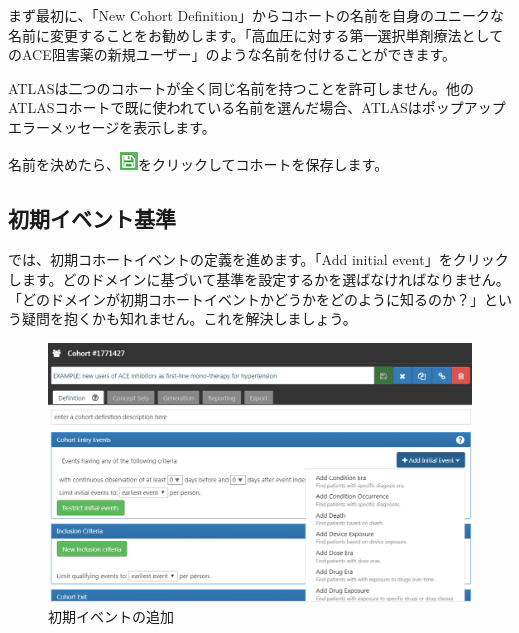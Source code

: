 \documentclass[
  11pt]{book}
\makeatletter
\newenvironment{kframe}{%
\medskip{}
\setlength{\fboxsep}{.8em}
 \def\at@end@of@kframe{}%
 \ifinner\ifhmode%
  \def\at@end@of@kframe{\end{minipage}}%
  \begin{minipage}{\columnwidth}%
 \fi\fi%
 \def\FrameCommand##1{\hskip\@totalleftmargin \hskip-\fboxsep
 \colorbox{myShadeColor}{##1}\hskip-\fboxsep
     \hskip-\linewidth \hskip-\@totalleftmargin \hskip\columnwidth}%
 \MakeFramed {\advance\hsize-\width
   \@totalleftmargin\z@ \linewidth\hsize
   \@setminipage}}%
 {\par\unskip\endMakeFramed%
 \at@end@of@kframe}
\newenvironment{rmdblock}[1]
  {
  \begin{itemize}
  \renewcommand{\labelitemi}{
    \raisebox{-.7\height}[0pt][0pt]{
      {\setkeys{Gin}{width=3em,keepaspectratio}\texttt{[image: images/\#1]}}
    }
  }
  \setlength{\fboxsep}{1em}
  \begin{kframe}
  \item
  }
  {
  \end{kframe}
  \end{itemize}
  }
\newenvironment{rmdimportant}
  {\begin{rmdblock}{important}}
  {\end{rmdblock}}
\theoremstyle{definition}
\theoremstyle{definition}
\theoremstyle{definition}
\theoremstyle{definition}
\theoremstyle{remark}
\makeatother
\begin{document}
まず最初に、「New Cohort Definition」からコホートの名前を自身のユニークな名前に変更することをお勧めします。「高血圧に対する第一選択単剤療法としてのACE阻害薬の新規ユーザー」のような名前を付けることができます。

\begin{rmdimportant}
ATLASは二つのコホートが全く同じ名前を持つことを許可しません。他のATLASコホートで既に使われている名前を選んだ場合、ATLASはポップアップエラーメッセージを表示します。
\end{rmdimportant}

名前を決めたら、\includegraphics{images/Cohorts/save.png}をクリックしてコホートを保存します。

\subsection{初期イベント基準}\label{ux521dux671fux30a4ux30d9ux30f3ux30c8ux57faux6e96}

では、初期コホートイベントの定義を進めます。「Add initial event」をクリックします。どのドメインに基づいて基準を設定するかを選ばなければなりません。「どのドメインが初期コホートイベントかどうかをどのように知るのか？」という疑問を抱くかも知れません。これを解決しましょう。

\begin{figure}

{\centering \includegraphics[width=1\linewidth]{images/Cohorts/ATLAS-initialevent} 

}

\caption{初期イベントの追加}\label{fig:ATLASinitialevent}
\end{figure}
\end{document}
